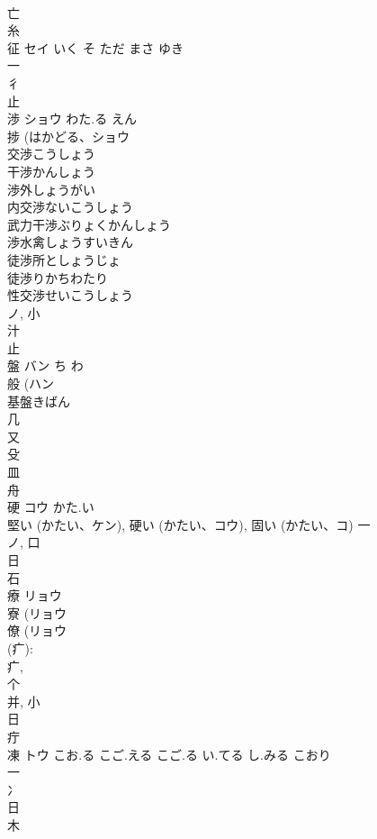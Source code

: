 \documentclass[8pt]{extreport}
\begin{document}
\begin{CJK}{UTF8}{min}
\\	亡 
\\	糸 
\\	征	セイ	いく そ ただ まさ ゆき	
\\	一 
\\	彳 
\\	止 
\\	渉	ショウ	わた.る えん	
\\	捗 (はかどる、ショウ 
\\	交渉こうしょう
\\	干渉かんしょう
\\	渉外しょうがい
\\	内交渉ないこうしょう
\\	武力干渉ぶりょくかんしょう
\\	渉水禽しょうすいきん
\\	徒渉所としょうじょ
\\	徒渉りかちわたり
\\	性交渉せいこうしょう
\\	ノ, 小 
\\	汁 
\\	止 
\\	盤	バン	ち わ	
\\	般 (ハン 
\\	基盤きばん
\\	几 
\\	又 
\\	殳 
\\	皿 
\\	舟 
\\	硬	コウ	かた.い	
\\	堅い (かたい、ケン), 硬い (かたい、コウ), 固い (かたい、コ)			一 
\\	ノ, 口 
\\	日 
\\	石 
\\	療	リョウ		
\\	寮 (リョウ 
\\	僚 (リョウ 
\\	(疒): 
\\	疒, 
\\	个 
\\	并, 小 
\\	日 
\\	疔 
\\	凍	トウ	こお.る こご.える こご.る い.てる し.みる こおり	
\\	一 
\\	冫 
\\	日 
\\	木 

\end{CJK}
\end{document}
